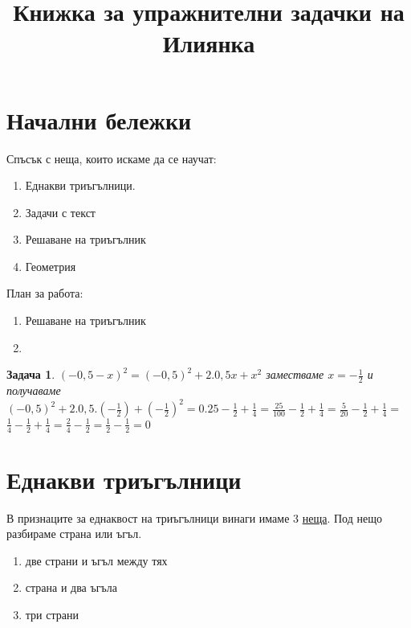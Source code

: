 \documentclass{article}
\date{}
\title{Книжка за упражнителни задачки на Илиянка}
\newtheorem{problem}{Задача}
\begin{document}
	
	
	\maketitle
	\tableofcontents
	
	\section{Начални бележки}
	Спъсък с неща, които искаме да се научат:
	\begin{enumerate}
		\item Еднакви триъгълници.
		\item Задачи с текст
		\item Решаване на триъгълник
		\item Геометрия
		
		
	\end{enumerate}
	План за работа:
	\begin{enumerate}
		\item Решаване на триъгълник
		\item 
	\end{enumerate}
	
	\begin{problem}
		$(-0,5-x)^2 = (-0,5)^2 + 2.0,5x + x^2$ заместваме $x = -\frac{1}{2} $ и получаваме
	 $(-0,5)^2 + 2.0,5.(-\frac{1}{2}) + (-\frac{1}{2})^2 = 0.25 -\frac{1}{2} + \frac{1}{4}= \frac{25}{100}-\frac{1}{2} + \frac{1}{4} = \frac{5}{20}-\frac{1}{2} + \frac{1}{4} =$ \\
	 $\frac{1}{4}-\frac{1}{2} + \frac{1}{4} = \frac{2}{4} - \frac{1}{2}= \frac{1}{2} - \frac{1}{2} = 0 $ 
\end{problem}
	
	\section{Еднакви триъгълници}
	В признаците за еднаквост на триъгълници винаги имаме 3 \underline{неща}. Под нещо разбираме страна или ъгъл. 
	\begin{enumerate}
		\item две страни и ъгъл между тях
		\item страна и два ъгъла
		\item три страни
	\end{enumerate}
	
	
	
\end{document}

